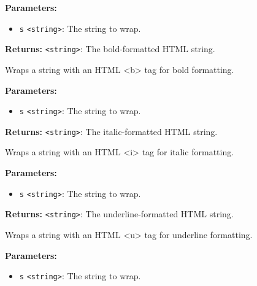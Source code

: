 \documentclass[12pt,a4paper]{article}
\begin{document}
\noindent \textbf{Parameters:}
\begin{itemize}
  \item \texttt{s} \texttt{<string>}: The string to wrap.
\end{itemize}

\noindent \textbf{Returns:} \texttt{<string>}: The bold-formatted HTML string.

\noindent Wraps a string with an HTML <b> tag for bold formatting.

\vspace{5mm}
\noindent {}


\noindent \textbf{Parameters:}
\begin{itemize}
  \item \texttt{s} \texttt{<string>}: The string to wrap.
\end{itemize}

\noindent \textbf{Returns:} \texttt{<string>}: The italic-formatted HTML string.

\noindent Wraps a string with an HTML <i> tag for italic formatting.

\vspace{5mm}
\noindent {}


\noindent \textbf{Parameters:}
\begin{itemize}
  \item \texttt{s} \texttt{<string>}: The string to wrap.
\end{itemize}

\noindent \textbf{Returns:} \texttt{<string>}: The underline-formatted HTML string.

\noindent Wraps a string with an HTML <u> tag for underline formatting.

\vspace{5mm}
\noindent {}


\noindent \textbf{Parameters:}
\begin{itemize}
  \item \texttt{s} \texttt{<string>}: The string to wrap.
\end{itemize}
\end{document}
